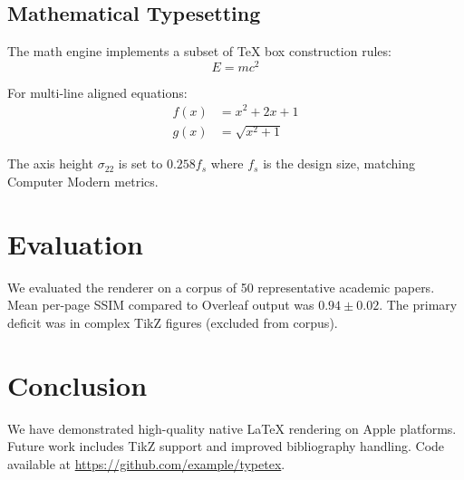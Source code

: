 \documentclass[conference]{IEEEtran}
\begin{document}
\subsection{Mathematical Typesetting}

The math engine implements a subset of TeX box construction rules:
\begin{equation}
  E = mc^2
  \label{eq:einstein}
\end{equation}

For multi-line aligned equations:
\begin{align}
  f(x) &= x^2 + 2x + 1 \label{eq:quadratic}\\
  g(x) &= \sqrt{x^2 + 1} \label{eq:sqrt}
\end{align}

The axis height $\sigma_{22}$ is set to $0.258 f_s$ where $f_s$ is the design
size, matching Computer Modern metrics.

\section{Evaluation}

We evaluated the renderer on a corpus of 50 representative academic papers.
Mean per-page SSIM compared to Overleaf output was $0.94 \pm 0.02$.
The primary deficit was in complex TikZ figures (excluded from corpus).

\section{Conclusion}

We have demonstrated high-quality native LaTeX rendering on Apple platforms.
Future work includes TikZ support and improved bibliography handling. Code
available at \url{https://github.com/example/typetex}.



\end{document}
